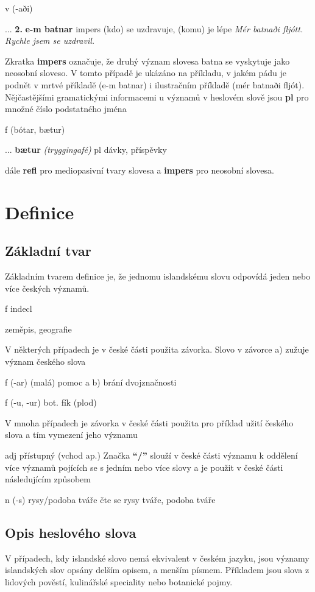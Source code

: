  {\small{ v (-aði)}

...
\textbf{2.}\textbf{ e-m batnar }{\small{impers }}{(kdo) se uzdravuje, (komu) je lépe } 
	\textit{Mér batnaði fljótt.} \textit{Rychle jsem se uzdravil. }}
	
Zkratka \textbf{impers} označuje, že druhý význam slovesa batna se vyskytuje jako neosobní sloveso. V tomto případě je ukázáno na příkladu, v jakém pádu je podnět v mrtvé příkladě (e-m batnar) i ilustračním příkladě (mér batnaði fljót). 
Nějčastějšími gramatickými informacemi u významů v heslovém slově jsou \textbf{pl} pro množné číslo podstatného jména    


 {\small{ f (bótar, bætur)}

...
\textbf{bætur} \textit{(tryggingafé)} {\small{pl} {dávky, příspěvky }}}
dále \textbf{refl} pro mediopasivní tvary slovesa a \textbf{impers} pro neosobní slovesa. 


\section{Definice}

\subsection{Základní tvar}
Základním tvarem definice je, že jednomu islandskému slovu odpovídá jeden nebo více českých významů.


 {\small{ f indecl}

{zeměpis, geografie}}
V některých případech je v české části použita závorka. Slovo v závorce a) zužuje význam českého slova 


 {\small{ f (-ar)} 
{(malá) pomoc }}
a b) brání dvojznačnosti


 {\small{ f (-u, -ur)}
\footnotesize{bot.} {fík (plod) }}

V mnoha případech je závorka v české části použita pro příklad užití českého slova a tím vymezení jeho významu

 {\small{ adj}
{přístupný (vchod ap.) }}
Značka \textbf{“/”} slouží v české části významu k oddělení více významů pojících se s jedním nebo více slovy a je použit v české části následujícím způsobem

 {\small{ n (-s)}
{rysy/podoba tváře }}
čte se rysy tváře, podoba tváře

\subsection{Opis heslového slova}
V případech, kdy islandské slovo nemá ekvivalent v českém jazyku, jsou významy islandských slov opsány  delším opisem, a menším písmem. Příkladem jsou slova z lidových pověstí, kulinářské speciality nebo botanické pojmy. 

